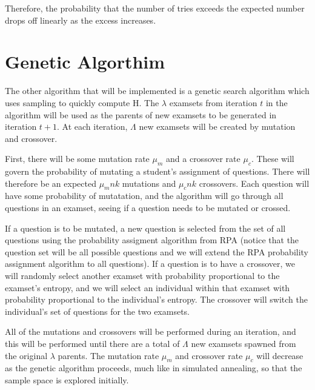 \documentclass[psamsfonts]{amsart}
\begin{document}
Therefore, the probability that the number of tries exceeds the expected number drops off linearly as the excess increases.

\section{Genetic Algorthim}
 
The other algorithm that will be implemented is a genetic search algorithm which uses sampling to quickly compute $\mathrm{H}$. The $\lambda$ examsets from iteration $t$ in the algorithm will be used as the parents of new examsets to be generated in iteration $t+1$. At each iteration, $\Lambda$ new examsets will be created by mutation and crossover.

First, there will be some mutation rate $\mu_m$ and a crossover rate $\mu_c$. These will govern the probability of mutating a student's assignment of questions. There will therefore be an expected $\mu_m nk$ mutations and $\mu_c nk$ crossovers. Each question will have some probability of mutatation, and the algorithm will go through all questions in an examset, seeing if a question needs to be mutated or crossed. 

If a question is to be mutated, a new question is selected from the set of all questions using the probability assigment algorithm from RPA (notice that the question set will be all possible questions and we will extend the RPA probability assignment algorithm to all questions). If a question is to have a crossover, we will randomly select another examset with probability proportional to the examset's entropy, and we will select an individual within that examset with probability proportional to the individual's entropy. The crossover will switch the individual's set of questions for the two examsets. 

All of the mutations and crossovers will be performed during an iteration, and this will be performed until there are a total of $\Lambda$ new examsets spawned from the original $\lambda$ parents. The mutation rate $\mu_m$ and crossover rate $\mu_c$ will decrease as the genetic algorithm proceeds, much like in simulated annealing, so that the sample space is explored initially. 
\end{document}
